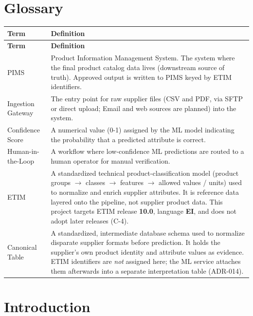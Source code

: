 \documentclass[12pt, a4paper]{article}
\begin{document}
\vspace{1cm}

\section*{Glossary}
\begin{longtable}{@{}l >{\raggedright\arraybackslash}p{12cm}@{}}
\toprule
\textbf{Term} & \textbf{Definition} \\
\midrule
\endfirsthead
\toprule
\textbf{Term} & \textbf{Definition} \\
\midrule
\endhead
\bottomrule
\endfoot
\bottomrule
\endlastfoot
PIMS & Product Information Management System. The system where the final product catalog data lives (downstream source of truth). Approved output is written to PIMS keyed by ETIM identifiers. \\
\addlinespace
Ingestion Gateway & The entry point for raw supplier files (CSV and PDF, via SFTP or direct upload; Email and web sources are planned) into the system. \\
\addlinespace
Confidence Score & A numerical value (0-1) assigned by the ML model indicating the probability that a predicted attribute is correct. \\
\addlinespace
Human-in-the-Loop & A workflow where low-confidence ML predictions are routed to a human operator for manual verification. \\
\addlinespace
ETIM & A standardized technical product-classification model (product groups $\rightarrow$ classes $\rightarrow$ features $\rightarrow$ allowed values / units) used to normalize and enrich supplier attributes. It is reference data layered onto the pipeline, not supplier product data. This project targets ETIM release \textbf{10.0}, language \textbf{EI}, and does not adopt later releases (C-4). \\
\addlinespace
Canonical Table & A standardized, intermediate database schema used to normalize disparate supplier formats before prediction. It holds the supplier's own product identity and attribute values as evidence. ETIM identifiers are \emph{not} assigned here; the ML service attaches them afterwards into a separate interpretation table (ADR-014). \\
\end{longtable}
\newpage


\section{Introduction}
\end{document}
